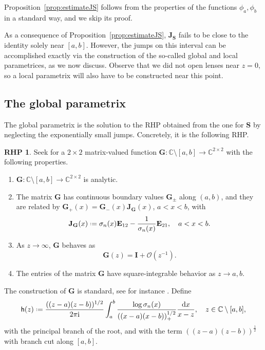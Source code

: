 \documentclass[reqno,a4paper,11pt]{amsart}
\newcommand{\C}{\mathbb{C}}
\newcommand{\Boh}{\mathcal{O}}
\newcommand{\ii}{\mathrm{i}}
\newcommand{\dd}{\mathrm{d}}
\newcommand*{\deff}{\mathrel{\vcenter{\baselineskip0.5ex \lineskiplimit0pt
                     \hbox{\scriptsize.}\hbox{\scriptsize.}}}%
                     =}
\renewcommand{\bm}{\mathbf}
\newcommand{\msf}{\mathsf}
\theoremstyle{definition}
\newtheorem{rhp}[theorem]{RHP}
\theoremstyle{remark}
\numberwithin{equation}{section}
\begin{document}
Proposition~\ref{prop:estimateJS} follows from the properties of the functions $\phi_a,\phi_b$ in a standard way, and we skip its proof.

As a consequence of Proposition~\ref{prop:estimateJS}, $\bm J_{\bm S}$ fails to be close to the identity solely near $[a,b]$. However, the jumps on this interval can be accomplished exactly via the construction of the so-called global and local parametrices, as we now discuss. Observe that we did not open lenses near $z=0$, so a local parametrix will also have to be constructed near this point.

\subsection{The global parametrix}\hfill 

The global parametrix is the solution to the RHP obtained from the one for $\bm S$ by neglecting the exponentially small jumps. Concretely, it is the following RHP.

\begin{rhp} Seek for a $2\times 2$ matrix-valued function $\bm G:\C\setminus [a,b]\to \C^{2\times 2}$ with the following properties.
\begin{enumerate}[\rm (i)]
\item $\bm G:\C\setminus [a,b]\to \C^{2\times 2}$ is analytic.
\item The matrix $\bm G$ has continuous boundary values $\bm G_\pm$ along $(a,b)$, and they are related by $\bm G_+(x)=\bm G_-(x)\bm J_{\bm G}(x)$, $a<x<b$, with
%
$$
\bm J_{\bm G}(x)\deff \sigma_n(x)\bm E_{12}-\frac{1}{\sigma_n(x)}\bm E_{21},\quad a<x<b.
$$
%
\item As $z\to \infty$, $\bm G$ behaves as
%
$$
\bm G(z)=\bm I+\Boh(z^{-1}).
$$
%
\item The entries of the matrix $\bm G$ have square-integrable behavior as $z\to a,b$.
%
\end{enumerate}
\end{rhp}

The construction of $\bm G$ is standard, see for instance \cite[Section~10.3]{GhosalSilva22}. Define
%
\begin{equation} \label{eq:h_exponent}
\msf h(z)\deff \frac{((z-a)(z-b))^{1/2}}{2\pi\ii}\int_a^b \frac{\log\sigma_n(x)}{((x-a)(x-b))^{1/2}_+}\frac{\dd x}{x-z},\quad z\in \C\setminus [a,b],
\end{equation}
%
with the principal branch of the root, and with the term $((z-a)(z-b))^{\frac{1}{2}}$ with branch cut along $[a,b]$.
\end{document}
